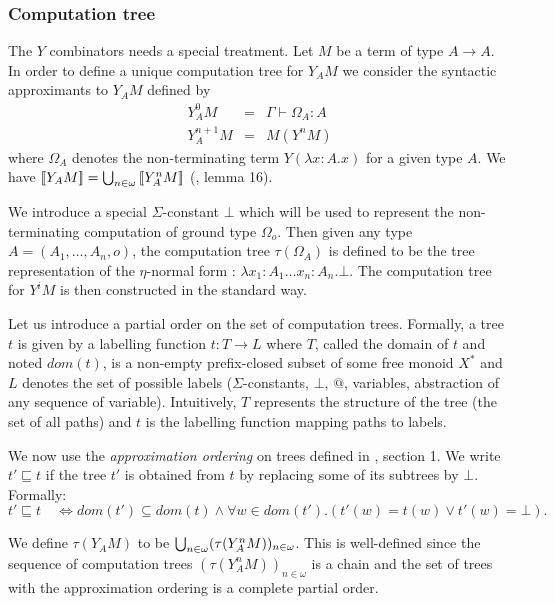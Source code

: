 \subsubsection{Computation tree}

The $Y$ combinators needs a special treatment. Let $M$ be a term of type $A \rightarrow A$.
In order to define a unique computation tree for $Y_A M$ we consider the syntactic approximants to $Y_A M$ defined by
\begin{eqnarray*}
Y^0_A M &=& \Gamma \vdash \Omega_A : A\\
Y^{n+1}_A M &=& M( Y^n M )
\end{eqnarray*}
where $\Omega_A$ denotes the non-terminating term $Y(\lambda x:A .x)$ for a given type $A$.
We have ${[\![ Y_A M ]\!]} = \bigcup_{n\in\omega} {[\![ Y_A^n M ]\!]}$ (\cite{abramsky:game-semantics-tutorial}, lemma 16).

We introduce a special $\Sigma$-constant $\bot$ which will be used to represent the non-terminating computation
of ground type $\Omega_o$. Then given any type $A = (A_1, \ldots, A_n, o)$, the computation tree $\tau(\Omega_A)$ is
defined to be the tree representation of the $\eta$-normal form : $\lambda x_1:A_1 \ldots x_n:A_n . \bot $.
The computation tree for $Y^i M$ is then constructed in the standard way.

Let us introduce a partial order on the set of computation trees.
Formally, a tree $t$ is given by a labelling function $t:T\rightarrow L$ where
$T$, called the domain of $t$ and noted $dom(t)$, is a non-empty prefix-closed subset of some free monoid $X^*$
and $L$ denotes the set of possible labels ($\Sigma$-constants, $\bot$, $@$, variables,
abstraction of any sequence of variable).
Intuitively, $T$ represents the structure of the tree (the set of all paths) and $t$ is the labelling function mapping paths to labels.


We now use the \emph{approximation ordering} on trees defined in \cite{KNU02}, section 1.
We write $t' \sqsubseteq t$ if the tree $t'$ is obtained from $t$ by replacing some of its subtrees by $\bot$. Formally:
$$t' \sqsubseteq t \quad \iff dom(t') \subseteq dom(t) \wedge \forall  w \in dom(t'). (t'(w) = t(w) \vee t'(w) = \bot).$$

We define $\tau(Y_A M)$ to be $\bigcup_{n\in\omega}(\tau(Y_A^n M))_{n\in\omega}$.
This is well-defined since the sequence of computation trees $(\tau(Y_A^n M))_{n\in\omega}$ is a chain
and the set of trees with the approximation ordering is a complete partial order.



